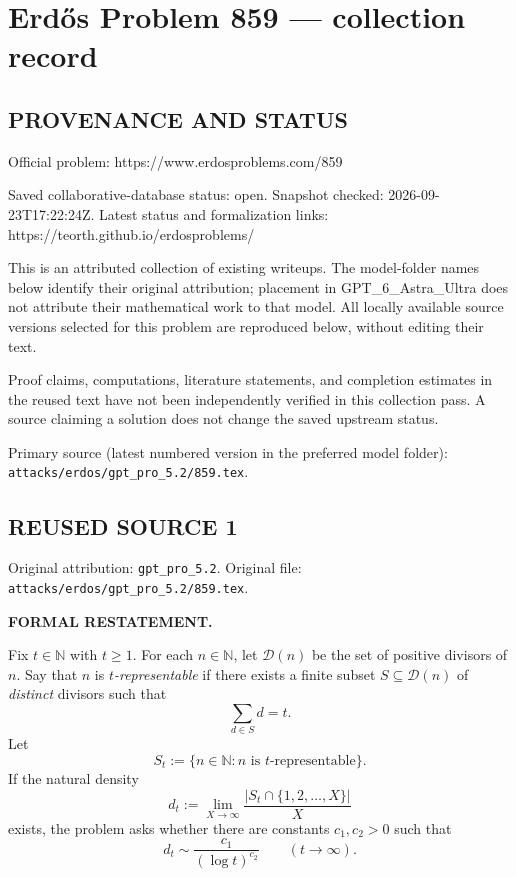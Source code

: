 \section*{Erd\H{o}s Problem 859 --- collection record}

\subsection*{PROVENANCE AND STATUS}
Official problem: https://www.erdosproblems.com/859

Saved collaborative-database status: open.
Snapshot checked: 2026-09-23T17:22:24Z.
Latest status and formalization links: https://teorth.github.io/erdosproblems/

This is an attributed collection of existing writeups. The model-folder names below identify their original attribution; placement in GPT\_6\_Astra\_Ultra does not attribute their mathematical work to that model. All locally available source versions selected for this problem are reproduced below, without editing their text.

Proof claims, computations, literature statements, and completion estimates in the reused text have not been independently verified in this collection pass. A source claiming a solution does not change the saved upstream status.

Primary source (latest numbered version in the preferred model folder): \texttt{attacks/erdos/gpt\_pro\_5.2/859.tex}.

\subsection*{REUSED SOURCE 1}
Original attribution: \texttt{gpt\_pro\_5.2}.
Original file: \texttt{attacks/erdos/gpt\_pro\_5.2/859.tex}.


\noindent\textbf{FORMAL RESTATEMENT.}

Fix $t\in\mathbb N$ with $t\ge 1$. For each $n\in\mathbb N$, let $\mathcal D(n)$ be the set of positive divisors of $n$.
Say that $n$ is \emph{$t$-representable} if there exists a finite subset $S\subseteq \mathcal D(n)$ of \emph{distinct} divisors such that
\[
\sum_{d\in S} d = t.
\]
Let
\[
S_t := \{n\in\mathbb N : n\text{ is $t$-representable}\}.
\]
If the natural density
\[
 d_t := \lim_{X\to\infty} \frac{|S_t\cap\{1,2,\dots,X\}|}{X}
\]
exists, the problem asks whether there are constants $c_1,c_2>0$ such that
\[
 d_t \sim \frac{c_1}{(\log t)^{c_2}} \qquad (t\to\infty).
\]


